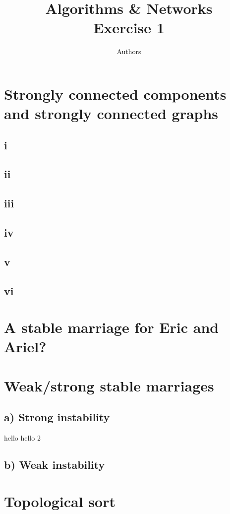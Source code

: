 \documentclass[a4paper]{article}
\author{Authors}
\title{Algorithms \& Networks \\ Exercise 1}
\begin{document}
\maketitle
\section{Strongly connected components and strongly connected graphs}
\subsection*{i}
\subsection*{ii}
\subsection*{iii}
\subsection*{iv}
\subsection*{v}
\subsection*{vi}

\section{A stable marriage for Eric and Ariel?}

\section{Weak/strong stable marriages}
\subsection*{a) Strong instability}
hello
hello 2
\subsection*{b) Weak instability}

\section{Topological sort}
\end{document}
